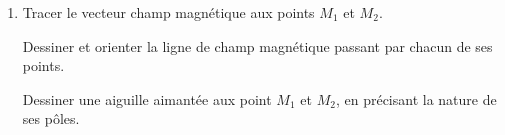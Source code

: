 \hfill
\begin{minipage}[t][][t]{0.56\linewidth}
    \begin{enumerate}[resume=x]
        \item Tracer le vecteur champ magnétique aux points $M_{1}$ et $M_{2}$.

              Dessiner et orienter la ligne de champ magnétique passant par
              chacun de ses points.

              Dessiner une aiguille aimantée aux point $M_{1}$ et $M_{2}$, en
              précisant la nature de ses pôles.
    \end{enumerate}
    \vspace{1.2cm}
    \begin{figure}[H]
        \centering
    \end{figure}
\end{minipage}


